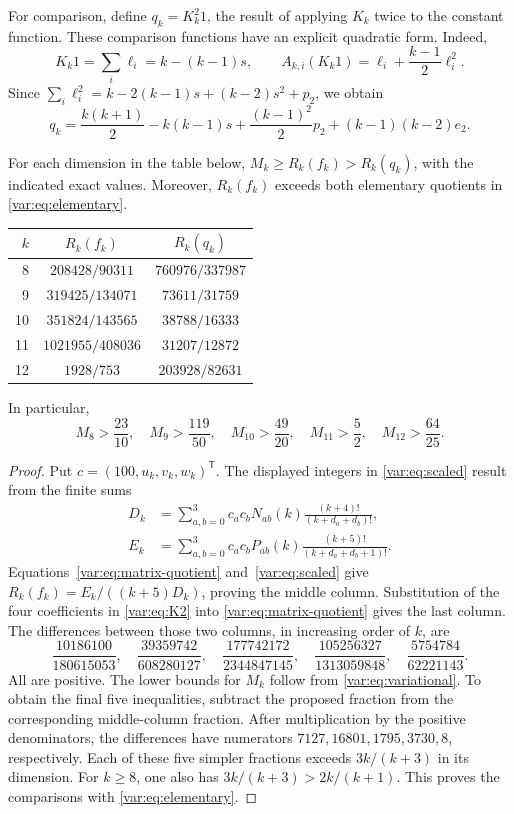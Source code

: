 \documentclass[11pt]{article}
\begin{document}
For comparison, define $q_k=K_k^2 1$, the result of applying $K_k$ twice
to the constant function.  These comparison functions have an explicit
quadratic form.  Indeed,
\[
 K_k1=\sum_i\ell_i=k-(k-1)s,\qquad
 A_{k,i}(K_k1)=\ell_i+\frac{k-1}{2}\ell_i^2.
\]
Since
$\sum_i\ell_i^2=k-2(k-1)s+(k-2)s^2+p_2$,
we obtain
\begin{equation}\label{var:eq:K2}
 q_k=\frac{k(k+1)}2-k(k-1)s
                   +\frac{(k-1)^2}{2}p_2+(k-1)(k-2)e_2.
\end{equation}

\begin{theorem}
For\label{var:thm:bounds} each dimension in the table below,
$M_k\geq R_k(f_k)>R_k(q_k)$, with the indicated exact values.
Moreover, $R_k(f_k)$ exceeds both elementary quotients in
\eqref{var:eq:elementary}.
\begin{center}
\begin{tabular}{rcc}
\toprule
$k$&$R_k(f_k)$&$R_k(q_k)$\\
\midrule
8&$208428/90311$&$760976/337987$\\
9&$319425/134071$&$73611/31759$\\
10&$351824/143565$&$38788/16333$\\
11&$1021955/408036$&$31207/12872$\\
12&$1928/753$&$203928/82631$\\
\bottomrule
\end{tabular}
\end{center}
In particular,
\[
 M_8>\frac{23}{10},\quad M_9>\frac{119}{50},\quad
 M_{10}>\frac{49}{20},\quad M_{11}>\frac52,\quad M_{12}>\frac{64}{25}.
\]
\end{theorem}

\begin{proof}
Put $c=(100,u_k,v_k,w_k)^{\mathsf T}$.
The displayed integers in \eqref{var:eq:scaled} result from the finite sums
\begin{align}
 D_k&=\sum_{a,b=0}^3 c_ac_bN_{ab}(k)
                  \frac{(k+4)!}{(k+d_a+d_b)!},\label{var:eq:Dsum}\\
 E_k&=\sum_{a,b=0}^3 c_ac_bP_{ab}(k)
                  \frac{(k+5)!}{(k+d_a+d_b+1)!}.
 \label{var:eq:Esum}
\end{align}
Equations~\eqref{var:eq:matrix-quotient} and~\eqref{var:eq:scaled} give
$R_k(f_k)=E_k/((k+5)D_k)$, proving the middle column.
Substitution of the four coefficients in \eqref{var:eq:K2} into
\eqref{var:eq:matrix-quotient} gives the last column.
The differences between those two columns, in increasing order of $k$, are
\[
 \frac{10186100}{180615053},\quad
 \frac{39359742}{608280127},\quad
 \frac{177742172}{2344847145},\quad
 \frac{105256327}{1313059848},\quad
 \frac{5754784}{62221143}.
\]
All are positive.
The lower bounds for $M_k$ follow from \eqref{var:eq:variational}.
To obtain the final five inequalities, subtract the proposed fraction
from the corresponding middle-column fraction.
After multiplication by the positive denominators, the differences have
numerators $7127,16801,1795,3730,8$, respectively.
Each of these five simpler fractions exceeds $3k/(k+3)$ in its dimension.
For $k\geq8$, one also has $3k/(k+3)>2k/(k+1)$.
This proves the comparisons with \eqref{var:eq:elementary}.
\end{proof}
\end{document}

